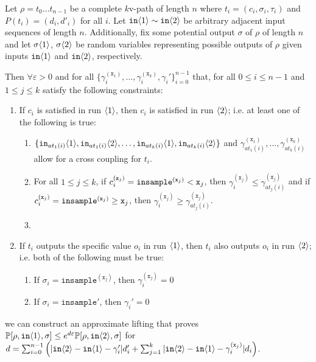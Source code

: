 \begin{lemma}\label{mvPathCouplingLemma}
    Let $\rho = t_0\ldots t_{n-1}$ be a complete $k$v-path of length $n$ where $t_i = (c_i, \sigma_i, \tau_i)$ and $P(t_i) = (d_i, d'_i)$ for all $i$. 
    Let $\texttt{in}\brangle{1}\sim \texttt{in}\brangle{2}$ be arbitrary adjacent input sequences of length $n$. Additionally, fix some potential output $\sigma$ of $\rho$ of length $n$ and let $\sigma\brangle{1}$, $\sigma\brangle{2}$ be random variables representing possible outputs of $\rho$ given inputs $\texttt{in}\brangle{1}$ and $\texttt{in}\brangle{2}$, respectively. 

    Then $\forall \varepsilon>0$ and for all $\{\gamma_i^{(\texttt{x}_1)},\ldots, \gamma_i^{(\texttt{x}_k)}, \gamma_i'\}_{i=0}^{n-1}$ that, for all $0\leq i\leq n-1$ and $1\leq j\leq k$ satisfy the following constraints:\begin{enumerate}
        \item If $c_i$ is satisfied in run $\brangle{1}$, then $c_i$ is satisfied in run $\brangle{2}$; i.e. at least one of the following is true:\begin{enumerate}
            \item $\{\texttt{in}_{at_1(i)}\brangle{1}, \texttt{in}_{at_1(i)}\brangle{2}, \ldots, \texttt{in}_{at_k(i)}\brangle{1}, \texttt{in}_{at_k(i)}\brangle{2}\}$ and $\gamma_{at_1(i)}^{(\texttt{x}_1)}, \ldots, \gamma_{at_k(i)}^{(\texttt{x}_k)}$ allow for a cross coupling for $t_i$.
            \item For all $1\leq j \leq k$, if $c_i^{(\texttt{x}_j)} = \mvlguard[\texttt{x}_j]$, then $\gamma_i^{(\texttt{x}_j)}\leq \gamma^{(\texttt{x}_j)}_{at_j(i)}$ and if $c_i^{(\texttt{x}_j)} = \mvgguard[\texttt{x}_j]$, then $\gamma_i^{(\texttt{x}_j)}\geq \gamma^{(\texttt{x}_j)}_{at_j(i)}$.
            \item {}
        \end{enumerate}
        \item If $t_i$ outputs the specific value $o_i$ in run $\brangle{1}$, then $t_i$ also outputs $o_i$ in run $\brangle{2}$; i.e. both of the following must be true: \begin{enumerate}
            \item If $\sigma_i = \texttt{insample}^{(\texttt{x}_j)}$, then $\gamma_i^{(\texttt{x}_j)}=0$
            \item If $\sigma_i = \texttt{insample}'$, then $\gamma_i'=0$
        \end{enumerate}
    \end{enumerate}
     we can construct an approximate lifting that proves $\PP[\rho, \texttt{in}\brangle{1}, \sigma]\leq e^{d\varepsilon}\PP[\rho, \texttt{in}\brangle{2}, \sigma]$ for $d = \sum_{i=0}^{n-1}\left(|\texttt{in}\brangle{2}-\texttt{in}\brangle{1}-\gamma_i'|d_i'+\sum_{j=1}^k|\texttt{in}\brangle{2}-\texttt{in}\brangle{1}-\gamma_i^{(\texttt{x}_j)}|d_i\right)$.
\end{lemma}

